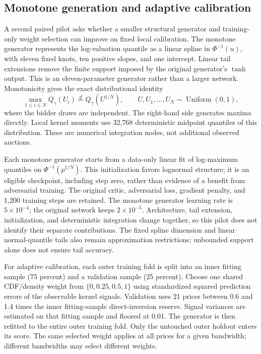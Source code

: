 \subsection{Monotone generation and adaptive calibration}
\label{sec:monotone-adaptive}

A second paired pilot asks whether a smaller structural generator and
training-only weight selection can improve on fixed local calibration.
The monotone generator represents the log-valuation quantile as a linear
spline in $\Phi^{-1}(u)$, with eleven fixed knots, ten positive slopes, and
one intercept. Linear tail extensions remove the finite support imposed by
the original generator's $\tanh$ output. This is an eleven-parameter
generator rather than a larger network. Monotonicity gives the exact
distributional identity
\begin{equation}
\max_{1\leq i\leq N}Q_\gamma(U_i)
\overset{d}{=}Q_\gamma(U^{1/N}),
\qquad U,U_1,\ldots,U_N\sim\operatorname{Uniform}(0,1),
\end{equation}
where the bidder draws are independent. The right-hand side generates
maxima directly. Local kernel moments use 32,768 deterministic midpoint
quantiles of this distribution. These are numerical integration nodes,
not additional observed auctions.

Each monotone generator starts from a data-only linear fit of log-maximum quantiles
on $\Phi^{-1}(p^{1/N})$. This initialization favors lognormal structure;
it is an eligible checkpoint, including step zero, rather than evidence
of a benefit from adversarial training. The original critic, adversarial
loss, gradient penalty, and 1,200 training steps are retained. The monotone
generator learning rate is $5\times10^{-4}$; the original network keeps
$2\times10^{-5}$. Architecture, tail extension, initialization, and
deterministic integration change together, so this pilot does not identify
their separate contributions.
The fixed spline dimension and linear normal-quantile tails also remain
approximation restrictions; unbounded support alone does not ensure tail accuracy.

For adaptive calibration, each outer training fold is split into an inner
fitting sample (75 percent) and a validation sample (25 percent). Choose
one shared CDF/density weight from $\{0,0.25,0.5,1\}$ using standardized
squared prediction errors of the observable kernel signals. Validation
uses 21 prices between 0.6 and 1.4 times the inner fitting-sample
direct-inversion reserve. Signal variances are estimated on that fitting
sample and floored at 0.01. The generator is then refitted to the entire
outer training fold. Only the untouched outer holdout enters its score.
The same selected weight applies at all prices for a given bandwidth;
different bandwidths may select different weights.

